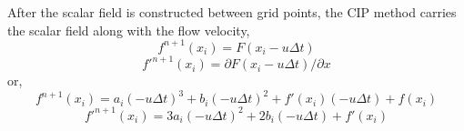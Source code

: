 After the scalar field is constructed between grid points,
the CIP method carries the scalar field along with the flow velocity,
\begin{equation}
f^{n+1}(x_i)=F(x_i-u \Delta t)
\end{equation}
\begin{equation}
f'^{n+1}(x_i)=\partial F(x_i-u \Delta t)/ \partial x
\end{equation}
or,
\begin{equation}
f^{n+1}(x_i)=a_i(-u\Delta t)^3+b_i(-u\Delta t)^2+f'(x_i)(-u\Delta
t)+f(x_i)
\label{eqn:advect-f}
\end{equation}
\begin{equation}
f'^{n+1}(x_i)=3a_i(-u\Delta t)^2+2b_i(-u\Delta t)+f'(x_i)
\label{eqn:advect-dfdx}
\end{equation}

